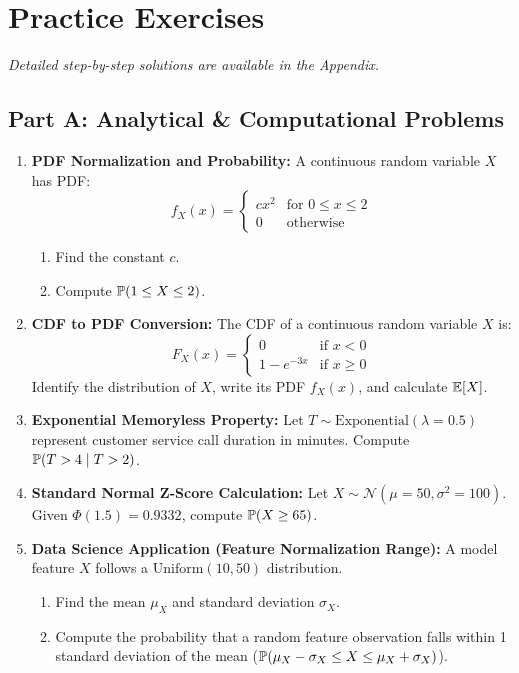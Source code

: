 \newpage
\section{Practice Exercises}
\textit{Detailed step-by-step solutions are available in the Appendix.}

\subsection*{Part A: Analytical \& Computational Problems}

\begin{enumerate}
\item \textbf{PDF Normalization and Probability:} A continuous random variable $X$ has PDF:
    $$f_X(x) = \begin{cases} c x^2 & \text{for } 0 \le x \le 2 \\ 0 & \text{otherwise} \end{cases}$$
    \begin{enumerate}
        \item Find the constant $c$.
        \item Compute $\P(1 \le X \le 2)$.
    \end{enumerate}

\item \textbf{CDF to PDF Conversion:} The CDF of a continuous random variable $X$ is:
    $$F_X(x) = \begin{cases} 0 & \text{if } x < 0 \\ 1 - e^{-3x} & \text{if } x \ge 0 \end{cases}$$
    Identify the distribution of $X$, write its PDF $f_X(x)$, and calculate $\E[X]$.

\item \textbf{Exponential Memoryless Property:} Let $T \sim \text{Exponential}(\lambda = 0.5)$ represent customer service call duration in minutes. Compute $\P(T > 4 \mid T > 2)$.

\item \textbf{Standard Normal Z-Score Calculation:} Let $X \sim \mathcal{N}(\mu = 50, \sigma^2 = 100)$. Given $\Phi(1.5) = 0.9332$, compute $\P(X \ge 65)$.

\item \textbf{Data Science Application (Feature Normalization Range):} A model feature $X$ follows a $\text{Uniform}(10, 50)$ distribution.
    \begin{enumerate}
        \item Find the mean $\mu_X$ and standard deviation $\sigma_X$.
        \item Compute the probability that a random feature observation falls within 1 standard deviation of the mean ($\P(\mu_X - \sigma_X \le X \le \mu_X + \sigma_X)$).
    \end{enumerate}
\end{enumerate}

